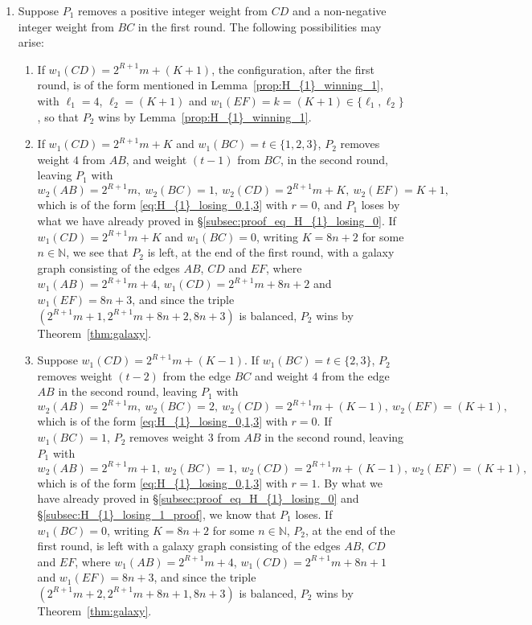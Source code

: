 \documentclass[11pt,reqno]{amsart}
\theoremstyle{definition}
\theoremstyle{definition}
\begin{document}
\begin{enumerate}
\item Suppose $P_{1}$ removes a positive integer weight from $CD$ and a non-negative integer weight from $BC$ in the first round. The following possibilities may arise:
\begin{enumerate}
\item If $w_{1}(CD)=2^{R+1}m+(K+1)$, the configuration, after the first round, is of the form mentioned in Lemma~\ref{prop:H_{1}_winning_1}, with $\ell_{1}=4$, $\ell_{2}=(K+1)$ and $w_{1}(EF)=k=(K+1)\in \{\ell_{1},\ell_{2}\}$, so that $P_{2}$ wins by Lemma~\ref{prop:H_{1}_winning_1}. 

\item If $w_{1}(CD)=2^{R+1}m+K$ and $w_{1}(BC)=t \in \{1,2,3\}$, $P_{2}$ removes weight $4$ from $AB$, and weight $(t-1)$ from $BC$, in the second round, leaving $P_{1}$ with
\begin{equation}
w_{2}(AB)=2^{R+1}m,\ w_{2}(BC)=1,\ w_{2}(CD)=2^{R+1}m+K,\ w_{2}(EF)=K+1,\nonumber
\end{equation}
which is of the form \eqref{eq:H_{1}_losing_0,1,3} with $r=0$, and $P_{1}$ loses by what we have already proved in \S\ref{subsec:proof_eq_H_{1}_losing_0}. If $w_{1}(CD)=2^{R+1}m+K$ and $w_{1}(BC)=0$, writing $K=8n+2$ for some $n\in\mathbb{N}$, we see that $P_{2}$ is left, at the end of the first round, with a galaxy graph consisting of the edges $AB$, $CD$ and $EF$, where $w_{1}(AB)=2^{R+1}m+4$, $w_{1}(CD)=2^{R+1}m+8n+2$ and $w_{1}(EF)=8n+3$, and since the triple $(2^{R+1}m+1,2^{R+1}m+8n+2,8n+3)$ is balanced, $P_{2}$ wins by Theorem~\ref{thm:galaxy}.

\item Suppose $w_{1}(CD)=2^{R+1}m+(K-1)$. If $w_{1}(BC)=t \in \{2,3\}$, $P_{2}$ removes weight $(t-2)$ from the edge $BC$ and weight $4$ from the edge $AB$ in the second round, leaving $P_{1}$ with
\begin{equation}
w_{2}(AB)=2^{R+1}m,\ w_{2}(BC)=2,\ w_{2}(CD)=2^{R+1}m+(K-1),\ w_{2}(EF)=(K+1),\nonumber
\end{equation}
which is of the form \eqref{eq:H_{1}_losing_0,1,3} with $r=0$. If $w_{1}(BC)=1$, $P_{2}$ removes weight $3$ from $AB$ in the second round, leaving $P_{1}$ with
\begin{equation}
w_{2}(AB)=2^{R+1}m+1,\ w_{2}(BC)=1,\ w_{2}(CD)=2^{R+1}m+(K-1),\ w_{2}(EF)=(K+1),\nonumber
\end{equation}
which is of the form \eqref{eq:H_{1}_losing_0,1,3} with $r=1$. By what we have already proved in \S\ref{subsec:proof_eq_H_{1}_losing_0} and \S\ref{subsec:H_{1}_losing_1_proof}, we know that $P_{1}$ loses. If $w_{1}(BC)=0$, writing $K=8n+2$ for some $n\in\mathbb{N}$, $P_{2}$, at the end of the first round, is left with a galaxy graph consisting of the edges $AB$, $CD$ and $EF$, where $w_{1}(AB)=2^{R+1}m+4$, $w_{1}(CD)=2^{R+1}m+8n+1$ and $w_{1}(EF)=8n+3$, and since the triple $(2^{R+1}m+2,2^{R+1}m+8n+1,8n+3)$ is balanced, $P_{2}$ wins by Theorem~\ref{thm:galaxy}. 


\end{enumerate}
\end{enumerate}
\end{document}
